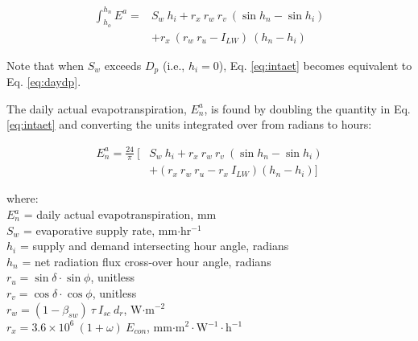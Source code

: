 \begin{equation}
\label{eq:intaet}
	\begin{split}
		\int_{h_o}^{h_n} E^a = & S_w\: h_i + 
		r_x\: r_w\: r_v \: \left(\sin h_n - \sin h_i\right) \\
		& + r_x\: \left(r_w\: r_u - I_{LW} \right)\: \left(h_n - h_i\right)
	\end{split}
\end{equation}

\noindent Note that when $S_w$ exceeds $D_p$ (i.e., $h_i = 0$), Eq. \ref{eq:intaet} becomes equivalent to Eq. \ref{eq:daydp}.

The daily actual evapotranspiration, $E^a_n$, is found by doubling the quantity in Eq. \ref{eq:intaet} and converting the units integrated over from radians to hours:

\begin{equation}
\label{eq:dayaet}
	\begin{split}
		E^a_n = \frac{24}{\pi}\: [ & S_w\: h_i
		          + r_x\: r_w\: r_v \: \left(\sin h_n - \sin h_i\right) \\
		        & + \left(r_x\: r_w\: r_u - r_x\: I_{LW}\right)\left(
		          h_n - h_i\right)]
	\end{split}
\end{equation}

\noindent where:\\
\indent $E^a_n$ = daily actual evapotranspiration, mm\\
\indent $S_w$ = evaporative supply rate, mm$\cdot$hr$^{-1}$\\
\indent $h_i$ = supply and demand intersecting hour angle, radians\\
\indent $h_n$ = net radiation flux cross-over hour angle, radians\\
\indent $r_u = \sin\delta\cdot\sin\phi$, unitless \\
\indent $r_v = \cos\delta\cdot\cos\phi$, unitless \\
\indent $r_w = \left(1-\beta_{sw}\right)\: \tau\: I_{sc}\: d_r$, W$\cdot$m$^{-2}$\\
\indent $r_x = 3.6\times10^6\: \left(1 + \omega\right)\: E_{con}$, mm$\cdot$m$^{2}\cdot$W$^{-1}\cdot$h$^{-1}$\\

